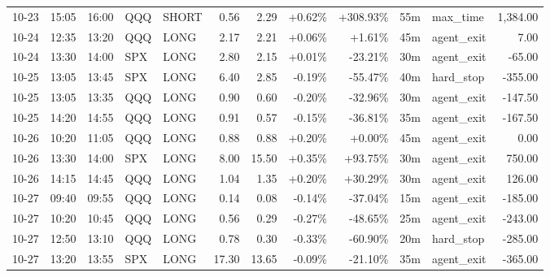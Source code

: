 \documentclass[11pt,a4paper,twoside]{article}
\begin{document}
\begin{center}
\begin{longtable}{>{\color{txtmain}}l l l l l r r r r r >{\color{txtmain}}l r}
10-23 & 15:05 & 16:00 & QQQ & SHORT & 0.56 & 2.29 & \textcolor{wingreen}{+0.62\%} & \textcolor{wingreen}{+308.93\%} & 55m & max\_time & \textcolor{wingreen}{1,384.00} \\
10-24 & 12:35 & 13:20 & QQQ & LONG & 2.17 & 2.21 & \textcolor{wingreen}{+0.06\%} & \textcolor{wingreen}{+1.61\%} & 45m & agent\_exit & \textcolor{wingreen}{7.00} \\
10-24 & 13:30 & 14:00 & SPX & LONG & 2.80 & 2.15 & \textcolor{wingreen}{+0.01\%} & \textcolor{lossred}{-23.21\%} & 30m & agent\_exit & \textcolor{lossred}{-65.00} \\
10-25 & 13:05 & 13:45 & SPX & LONG & 6.40 & 2.85 & \textcolor{lossred}{-0.19\%} & \textcolor{lossred}{-55.47\%} & 40m & hard\_stop & \textcolor{lossred}{-355.00} \\
10-25 & 13:05 & 13:35 & QQQ & LONG & 0.90 & 0.60 & \textcolor{lossred}{-0.20\%} & \textcolor{lossred}{-32.96\%} & 30m & agent\_exit & \textcolor{lossred}{-147.50} \\
10-25 & 14:20 & 14:55 & QQQ & LONG & 0.91 & 0.57 & \textcolor{lossred}{-0.15\%} & \textcolor{lossred}{-36.81\%} & 35m & agent\_exit & \textcolor{lossred}{-167.50} \\
10-26 & 10:20 & 11:05 & QQQ & LONG & 0.88 & 0.88 & \textcolor{wingreen}{+0.20\%} & \textcolor{wingreen}{+0.00\%} & 45m & agent\_exit & \textcolor{wingreen}{0.00} \\
10-26 & 13:30 & 14:00 & SPX & LONG & 8.00 & 15.50 & \textcolor{wingreen}{+0.35\%} & \textcolor{wingreen}{+93.75\%} & 30m & agent\_exit & \textcolor{wingreen}{750.00} \\
10-26 & 14:15 & 14:45 & QQQ & LONG & 1.04 & 1.35 & \textcolor{wingreen}{+0.20\%} & \textcolor{wingreen}{+30.29\%} & 30m & agent\_exit & \textcolor{wingreen}{126.00} \\
10-27 & 09:40 & 09:55 & QQQ & LONG & 0.14 & 0.08 & \textcolor{lossred}{-0.14\%} & \textcolor{lossred}{-37.04\%} & 15m & agent\_exit & \textcolor{lossred}{-185.00} \\
10-27 & 10:20 & 10:45 & QQQ & LONG & 0.56 & 0.29 & \textcolor{lossred}{-0.27\%} & \textcolor{lossred}{-48.65\%} & 25m & agent\_exit & \textcolor{lossred}{-243.00} \\
10-27 & 12:50 & 13:10 & QQQ & LONG & 0.78 & 0.30 & \textcolor{lossred}{-0.33\%} & \textcolor{lossred}{-60.90\%} & 20m & hard\_stop & \textcolor{lossred}{-285.00} \\
10-27 & 13:20 & 13:55 & SPX & LONG & 17.30 & 13.65 & \textcolor{lossred}{-0.09\%} & \textcolor{lossred}{-21.10\%} & 35m & agent\_exit & \textcolor{lossred}{-365.00} \\

\end{longtable}
\end{center}
\end{document}
